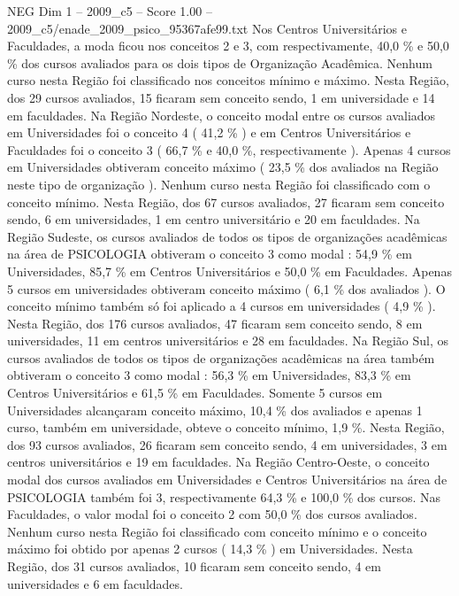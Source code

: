 \begin{textsample}{NEG Dim 1 – 2009\_c5 – Score 1.00 – 2009\_c5/enade\_2009\_psico\_95367afe99.txt}
Nos Centros Universitários e Faculdades, a moda ficou nos conceitos 2 e 3, com respectivamente, 40,0 \% e 50,0 \% dos cursos avaliados para os dois tipos de Organização Acadêmica.
Nenhum curso nesta Região foi classificado nos conceitos mínimo e máximo.
Nesta Região, dos 29 cursos avaliados, 15 ficaram sem conceito sendo, 1 em universidade e 14 em faculdades.
Na Região Nordeste, o conceito modal entre os cursos avaliados em Universidades foi o conceito 4 ( 41,2 \% ) e em Centros Universitários e Faculdades foi o conceito 3 ( 66,7 \% e 40,0 \%, respectivamente ).
Apenas 4 cursos em Universidades obtiveram conceito máximo ( 23,5 \% dos avaliados na Região neste tipo de organização ).
Nenhum curso nesta Região foi classificado com o conceito mínimo.
Nesta Região, dos 67 cursos avaliados, 27 ficaram sem conceito sendo, 6 em universidades, 1 em centro universitário e 20 em faculdades.
Na Região Sudeste, os cursos avaliados de todos os tipos de organizações acadêmicas na área de PSICOLOGIA obtiveram o conceito 3 como modal : 54,9 \% em Universidades, 85,7 \% em Centros Universitários e 50,0 \% em Faculdades.
Apenas 5 cursos em universidades obtiveram conceito máximo ( 6,1 \% dos avaliados ).
O conceito mínimo também só foi aplicado a 4 cursos em universidades ( 4,9 \% ).
Nesta Região, dos 176 cursos avaliados, 47 ficaram sem conceito sendo, 8 em universidades, 11 em centros universitários e 28 em faculdades.
Na Região Sul, os cursos avaliados de todos os tipos de organizações acadêmicas na área também obtiveram o conceito 3 como modal : 56,3 \% em Universidades, 83,3 \% em Centros Universitários e 61,5 \% em Faculdades.
Somente 5 cursos em Universidades alcançaram conceito máximo, 10,4 \% dos avaliados e apenas 1 curso, também em universidade, obteve o conceito mínimo, 1,9 \%.
Nesta Região, dos 93 cursos avaliados, 26 ficaram sem conceito sendo, 4 em universidades, 3 em centros universitários e 19 em faculdades.
Na Região Centro-Oeste, o conceito modal dos cursos avaliados em Universidades e Centros Universitários na área de PSICOLOGIA também foi 3, respectivamente 64,3 \% e 100,0 \% dos cursos.
Nas Faculdades, o valor modal foi o conceito 2 com 50,0 \% dos cursos avaliados.
Nenhum curso nesta Região foi classificado com conceito mínimo e o conceito máximo foi obtido por apenas 2 cursos ( 14,3 \% ) em Universidades.
Nesta Região, dos 31 cursos avaliados, 10 ficaram sem conceito sendo, 4 em universidades e 6 em faculdades.

\end{textsample}
